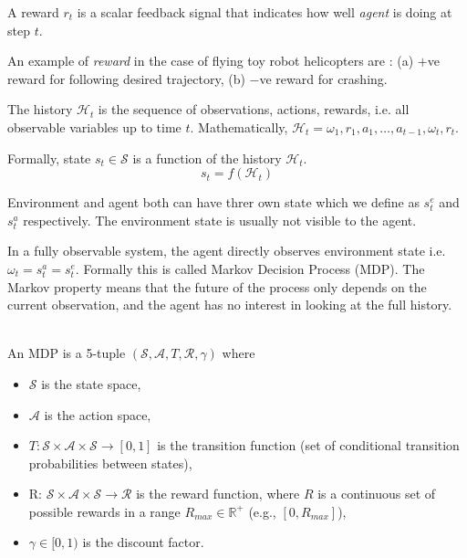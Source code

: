 A reward $r_t$ is a scalar feedback signal that indicates how well {\em agent} is doing at step $t$.

An example of  {\em reward} in the case of flying toy robot helicopters are : (a) $+$ve reward for following desired trajectory, (b) $−$ve reward for crashing.

 The history $\mathcal{H}_t$ is the sequence of observations, actions, rewards, i.e. all observable variables up to time $t$. Mathematically, $\mathcal{H}_t = \omega_1,r_1,a_1,\ldots,a_{t−1},\omega_t,r_t$.

Formally, state $s_t \in \mathcal{S}$ is a function of the history $\mathcal{H}_t$.
$$s_t = f(\mathcal{H}_t)$$

Environment and agent both can have threr own state which we define as $s_t^e$ and $s_t^a$ respectively. The environment state is usually not visible to the agent.

In a fully observable system, the agent directly observes environment state i.e. $\omega_t = s^a_t = s_t^e$. Formally this is called Markov Decision Process (MDP). The Markov property means that the future of the process only
depends on the current observation, and the agent has no interest in
looking at the full history.

\\  An MDP is a 5-tuple $(\mathcal{S}, \mathcal{A}, T, \mathcal{R}, \gamma)$ where
\begin{itemize}
  \item[] $\mathcal{S}$ is the state space,
  \item[] $\mathcal{A}$ is the action space,
  \item[] $T : \mathcal{S} \times \mathcal{A}\times \mathcal{S} \rightarrow [0, 1]$ is the transition function (set of conditional
  transition probabilities between states),
  \item[] R: $\mathcal{S} \times \mathcal{A}\times \mathcal{S} \rightarrow \mathcal{R}$ is the reward function, where $R$ is a continuous set of possible rewards in a range $R_{max} \in \mathbb{R}^+$ (e.g., $[0, R_{max}]$),
  \item[] $\gamma \in  [0, 1)$ is the discount factor.
\end{itemize}


